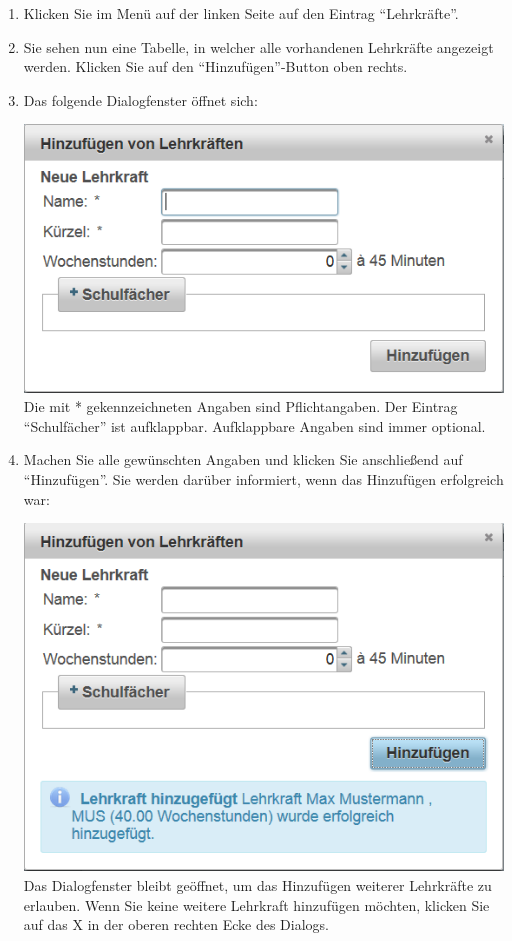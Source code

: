 \documentclass[fontsize=12pt]{scrartcl}
\begin{document}
\begin{enumerate}
\item Klicken Sie im Menü auf der linken Seite auf den Eintrag "`Lehrkräfte"'.
\item Sie sehen nun eine Tabelle, in welcher alle vorhandenen Lehrkräfte angezeigt werden. Klicken Sie auf den "`Hinzufügen"'-Button oben rechts.
\item Das folgende Dialogfenster öffnet sich: \medskip\\
	\begin{minipage}[t]{\linewidth}
            \includegraphics[width=.8\linewidth]{images/addTeacherDialog.png}
    \medskip\\
    Die mit * gekennzeichneten Angaben sind Pflichtangaben. Der Eintrag "`Schulfächer"' ist aufklappbar. Aufklappbare Angaben sind immer optional.
    \end{minipage}
\clearpage
\item Machen Sie alle gewünschten Angaben und klicken Sie anschließend auf "`Hinzufügen"'. Sie werden darüber informiert, wenn das Hinzufügen erfolgreich war: \medskip\\
	\begin{minipage}[t]{\linewidth}
            \includegraphics[width=.8\linewidth]{images/addedTeacher.png}
    \medskip\\
    Das Dialogfenster bleibt geöffnet, um das Hinzufügen weiterer Lehrkräfte zu erlauben. Wenn Sie keine weitere Lehrkraft hinzufügen möchten, klicken Sie auf das X in der oberen rechten Ecke des Dialogs.
    \end{minipage}
\end{enumerate}
\end{document}
